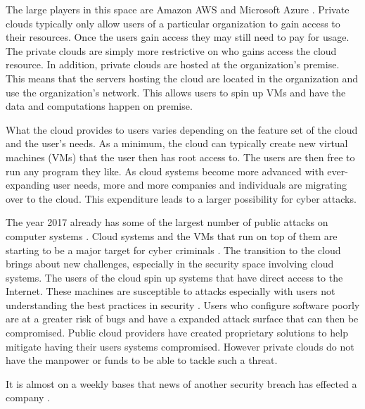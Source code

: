 \documentclass[12pt]{article}
\begin{document}
The large players in this space are Amazon AWS \cite{amazonAWS} and Microsoft Azure \cite{Azure2017}. Private clouds typically only allow users of a particular organization to gain access to their resources. Once the users gain access they may still need to pay for usage. The private clouds are simply more restrictive on who gains access the cloud resource. In addition, private clouds are hosted at the organization's premise.  This means that the servers hosting the cloud are located in the organization and use the organization's network. This allows users to spin up VMs and have the data and computations happen on premise.

What the cloud provides to users varies depending on the feature set of the cloud and the user's needs. As a minimum, the cloud can typically create new virtual machines (VMs) that the user then has root access to. The users are then free to run any program they like. As cloud systems become more advanced with ever-expanding user needs, more and more companies and individuals are migrating over to the cloud\cite{kondo2009cost}. This expenditure leads to a larger possibility for cyber attacks.

The year 2017 already has some of the largest number of public attacks on computer systems \cite{newman_2017}. Cloud systems and the VMs that run on top of them are starting to be a major target for cyber criminals \cite{kellerman}. The transition to the cloud brings about new challenges, especially in the security space involving cloud systems. The users of the cloud spin up systems that have direct access to the Internet. These machines are susceptible to attacks especially with users not understanding the best practices in security \cite{ng2009studying}. Users who configure software poorly are at a greater risk of bugs and have a expanded attack surface that can then be compromised.  Public cloud providers have created proprietary solutions to help mitigate having their users systems compromised. However private clouds do not have the manpower or funds to be able to tackle such a threat.

\iffalse
It is almost on a weekly bases that news of another security breach has effected a company \cite{newman_2017}.
\end{document}
